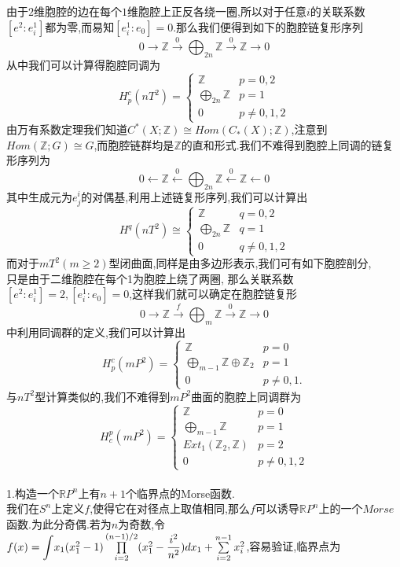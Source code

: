 \documentclass[b5paper]{ctexart}
\begin{document}
由于$2$维胞腔的边在每个$1$维胞腔上正反各绕一圈,所以对于任意$i$的关联系数$[e^2:e^1_i]$都为零,而易知$[e^1_i:e_0]=0$.那么我们便得到如下的胞腔链复形序列
\[0\rightarrow \mathbb{Z}\xrightarrow{0} \bigoplus_{2n}\mathbb{Z}\xrightarrow{0}\mathbb{Z}\rightarrow 0\]
从中我们可以计算得胞腔同调为
\[H_p^c(nT^2)=\left\lbrace \begin{array}{ll}
\mathbb{Z} & p=0,2\\
\bigoplus\limits_{2n}\mathbb{Z} & p=1\\
0 & p\neq 0,1,2
\end{array}\right. \]
由万有系数定理我们知道$C^*(X;\mathbb{Z})\cong Hom(C_*(X);\mathbb{Z})$,注意到$Hom(\mathbb{Z};G)\cong G$,而胞腔链群均是$\mathbb{Z}$的直和形式.我们不难得到胞腔上同调的链复形序列为\\
\[0\leftarrow \mathbb{Z}\xleftarrow{0} \bigoplus_{2n}\mathbb{Z}\xleftarrow{0}\mathbb{Z}\leftarrow 0\]
其中生成元为$e_j^i$的对偶基,利用上述链复形序列,我们可以计算出
\[H^q(nT^2)\cong\left\lbrace 
\begin{array}{ll}
\mathbb{Z}& q=0,2\\
\bigoplus\limits_{2n}\mathbb{Z}& q=1\\
0& q\neq 0,1,2
\end{array}\right. 
\]
而对于$mT^2(m\geq 2)$型闭曲面,同样是由多边形表示,我们可有如下胞腔剖分,\\只是由于二维胞腔在每个1为胞腔上绕了两圈,
那么关联系数$[e^2:e_i^1]=2,[e^1_i:e_0]=0$,这样我们就可以确定在胞腔链复形
\[0\rightarrow \mathbb{Z}\xrightarrow{f} \bigoplus_{m}\mathbb{Z}\xrightarrow{0}\mathbb{Z}\rightarrow 0\]
中利用同调群的定义,我们可以计算出
\[H_p^c(mP^2)=\left\lbrace \begin{array}{ll}
\mathbb{Z} & p=0\\
\bigoplus\limits_{m-1}\mathbb{Z}\oplus \mathbb{Z}_2 & p=1\\
0 & p\neq 0,1.
\end{array}\right. \]
与$nT^2$型计算类似的,我们不难得到$mP^2$曲面的胞腔上同调群为
\[H^p_c(mP^2)=\left\lbrace \begin{array}{ll}
\mathbb{Z} & p=0\\
\bigoplus\limits_{m-1}\mathbb{Z} & p=1\\
Ext_1(\mathbb{Z}_2,\mathbb{Z}) & p=2\\
0 & p\neq 0,1,2
\end{array}\right.\]\\
1.构造一个$\mathbb{R}P^n$上有$n+1$个临界点的Morse函数.\\
我们在$S^n$上定义$f$,使得它在对径点上取值相同,那么$f$可以诱导$\mathbb{R}P^n$上的一个$Morse$函数.为此分奇偶.若为$n$为奇数,令$f(x)=\mathlarger{\int} x_1(x_1^2-1)\prod\limits_{i=2}^{(n-1)/2}(x_1^2-\dfrac{i^2}{n^2})dx_1+\sum\limits_{i=2}^{n-1}x_i^2$,容易验证,临界点为
\end{document}
